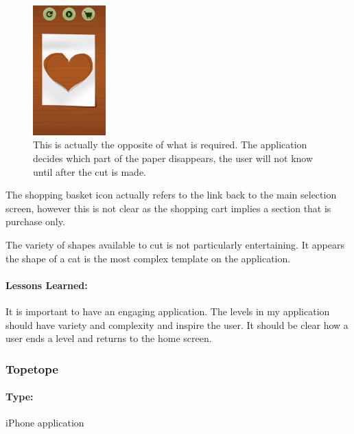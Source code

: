 \documentclass[11pt]{article}
\begin{document}
                 \begin{figure}
                \includegraphics[width=0.25\textwidth]{Images/paperCutCraftReveal}
                    \caption{This is actually the opposite of what is required. The application decides which part of the paper disappears, the user will not know until after the cut is made.}
                    \label{fig:paperCutCraftReveal}
                \end{figure}
                
                The shopping basket icon actually refers to the link back to the main selection screen, however this is not clear as the shopping cart implies a section that is purchase only. 
                
                The variety of shapes available to cut is not particularly entertaining. It appears the shape of a cat is the most complex template on the application.
                
                \paragraph{Lessons Learned:}
                
                It is important to have an engaging application. The levels in my application should have variety and complexity and inspire the user. It should be clear how a user ends a level and returns to the home screen.
                
                \subsubsection{Topetope}
                 
                \paragraph{Type:} iPhone application \cite{TopeTope}
\end{document}
